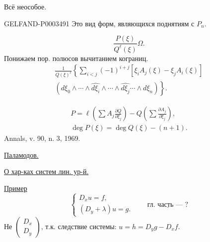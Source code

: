 Всё неособое.

\begin{GelfandAdjacentEvidence}{GELFAND-P000349}{1}
Это вид форм, являющихся поднятиям с $P_n$.
\end{GelfandAdjacentEvidence}

\begin{equation*}\frac{P(\xi)}{Q^\ell(\xi)}\Omega.\end{equation*}
Понижаем пор. полюсов вычитанием кограниц.
\begin{multline*}\frac1{Q(\xi)^\ell}\left\{\sum_{i<j}(-1)^{i+j}[\xi_i A_j(\xi)-\xi_j A_i(\xi)]\right.\\
\left.(d\xi_0\wedge\cdots\wedge\widehat{d\xi_i}\wedge\cdots\wedge\widehat{d\xi_j}\cdots\wedge d\xi_n)\right\}.
\end{multline*}



\begin{gather*}P=\ell\left(\sum A_j\frac{\partial Q}{\partial\xi_j}\right)-Q\left(\sum\frac{\partial A_j}{\partial\xi_j}\right),\\
\deg P(\xi)=\deg Q(\xi)-(n+1).\end{gather*}
Annals, v. 90, n. 3, 1969.

\uline{Паламодов.}

\uline{О хар-ках систем лин. ур-й.}
\begin{center}\end{center}

\uline{Пример}
\begin{equation*}\begin{cases}D_xu=f,\\(D_y+\lambda)u=g.\end{cases}\qquad\underline{\text{гл. часть --- ?}}\end{equation*}
Не $\begin{pmatrix}D_x\\D_y\end{pmatrix}$, т.к. следствие системы:
$u=h=D_yg-D_xf$.

